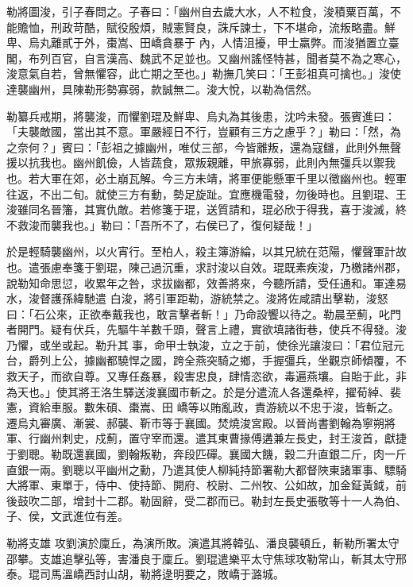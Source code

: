 \begin{pinyinscope}
 勒將圖浚，引子春問之。子春曰：「幽州自去歲大水，人不粒食，浚積粟百萬，不能贍恤，刑政苛酷，賦役殷煩，賊憲賢良，誅斥諫士，下不堪命，流叛略盡。鮮卑、烏丸離貳于外，棗嵩、田嶠貪暴于
 內，人情沮擾，甲士羸弊。而浚猶置立臺閣，布列百官，自言漢高、魏武不足並也。又幽州謠怪特甚，聞者莫不為之寒心，浚意氣自若，曾無懼容，此亡期之至也。」勒撫几笑曰：「王彭祖真可擒也。」浚使達襲幽州，具陳勒形勢寡弱，款誠無二。浚大悅，以勒為信然。



 勒纂兵戒期，將襲浚，而懼劉琨及鮮卑、烏丸為其後患，沈吟未發。張賓進曰：「夫襲敵國，當出其不意。軍嚴經日不行，豈顧有三方之慮乎？」勒曰：「然，為之奈何？」賓曰：「彭祖之據幽州，唯仗三部，今皆離叛，還為寇讎，此則外無聲援以抗我也。幽州飢儉，人皆蔬食，眾叛親離，甲旅寡弱，此則內無彊兵以禦我
 也。若大軍在郊，必土崩瓦解。今三方未靖，將軍便能懸軍千里以徵幽州也。輕軍往返，不出二旬。就使三方有動，勢足旋趾。宜應機電發，勿後時也。且劉琨、王浚雖同名晉籓，其實仇敵。若修箋于琨，送質請和，琨必欣于得我，喜于浚滅，終不救浚而襲我也。」勒曰：「吾所不了，右侯已了，復何疑哉！」



 於是輕騎襲幽州，以火宵行。至柏人，殺主簿游綸，以其兄統在范陽，懼聲軍計故也。遣張慮奉箋于劉琨，陳己過沉重，求討浚以自效。琨既素疾浚，乃檄諸州郡，說勒知命思愆，收累年之咎，求拔幽都，效善將來，今聽所請，受任通和。軍達易水，浚督護孫緯馳遣
 白浚，將引軍距勒，游統禁之。浚將佐咸請出擊勒，浚怒曰：「石公來，正欲奉戴我也，敢言擊者斬！」乃命設饗以待之。勒晨至薊，叱門者開門。疑有伏兵，先驅牛羊數千頭，聲言上禮，實欲填諸街巷，使兵不得發。浚乃懼，或坐或起。勒升其事，命甲士執浚，立之于前，使徐光讓浚曰：「君位冠元台，爵列上公，據幽都驍悍之國，跨全燕突騎之鄉，手握彊兵，坐觀京師傾覆，不救天子，而欲自尊。又專任姦暴，殺害忠良，肆情恣欲，毒遍燕壤。自貽于此，非為天也。」使其將王洛生驛送浚襄國市斬之。於是分遣流人各還桑梓，擢荀綽、裴憲，資給車服。數朱碩、棗嵩、田
 嶠等以賄亂政，責游統以不忠于浚，皆斬之。遷烏丸審廣、漸裳、郝襲、靳市等于襄國。焚燒浚宮殿。以晉尚書劉翰為寧朔將軍、行幽州刺史，戍薊，置守宰而還。遣其東曹掾傅遘兼左長史，封王浚首，獻捷于劉聰。勒既還襄國，劉翰叛勒，奔段匹磾。襄國大饑，穀二升直銀二斤，肉一斤直銀一兩。劉聰以平幽州之勳，乃遣其使人柳純持節署勒大都督陜東諸軍事、驃騎大將軍、東單于，侍中、使持節、開府、校尉、二州牧、公如故，加金鉦黃鉞，前後鼓吹二部，增封十二郡。勒固辭，受二郡而已。勒封左長史張敬等十一人為伯、子、侯，文武進位有差。



 勒將支雄
 攻劉演於廩丘，為演所敗。演遣其將韓弘、潘良襲頓丘，斬勒所署太守邵攀。支雄追擊弘等，害潘良于廩丘。劉琨遣樂平太守焦球攻勒常山，斬其太守邢泰。琨司馬溫嶠西討山胡，勒將逯明要之，敗嶠于潞城。




\end{pinyinscope}
